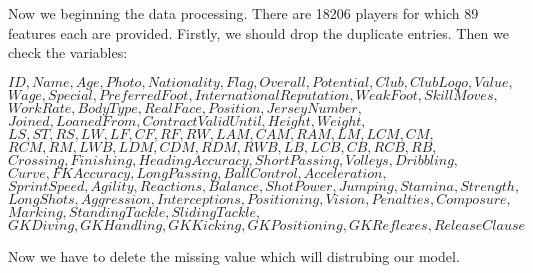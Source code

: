 \documentclass{article}
\begin{document}
Now we beginning the data processing.
There are 18206 players for which 89 features each are provided. Firstly, we should drop the duplicate entries. 
Then we check the variables: 
\begin{center}
$ID, Name, Age, Photo, Nationality, Flag, Overall, Potential, Club, Club Logo, Value,$\\ 
$Wage, Special, Preferred Foot, International Reputation, Weak Foot, Skill Moves,$\\
$Work Rate, Body Type, Real Face, Position, Jersey Number, $\\
$Joined, Loaned From, Contract Valid Until,Height, Weight,$\\
$LS, ST, RS, LW, LF, CF, RF, RW, LAM, CAM, RAM, LM, LCM, CM,$\\
$RCM, RM, LWB, LDM, CDM, RDM, RWB, LB, LCB, CB, RCB, RB,$ \\
$Crossing, Finishing, HeadingAccuracy, ShortPassing, Volleys, Dribbling,$\\ 
$Curve, FKAccuracy, LongPassing, BallControl, Acceleration,$\\ 
$SprintSpeed, Agility, Reactions, Balance, ShotPower, Jumping, Stamina, Strength,$\\ $LongShots, Aggression, Interceptions, Positioning, Vision, Penalties, Composure,$\\ $Marking, StandingTackle, SlidingTackle,$\\
$GKDiving, GKHandling, GKKicking, GKPositioning,
GKReflexes, Release Clause$
\end{center}
\par Now we have to delete the missing value which will distrubing our model. 
\end{document}
